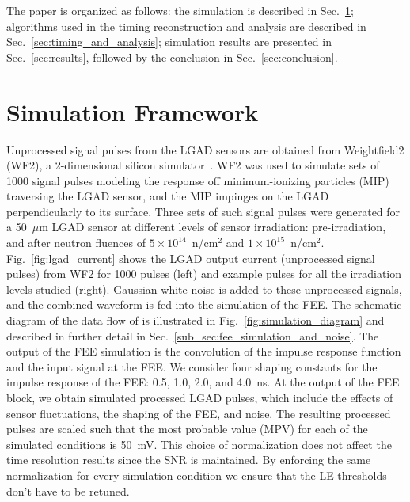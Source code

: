 \documentclass[preprint,1p]{elsarticle}
\begin{document}
The paper is organized as follows: the simulation is described in
Sec.~\ref{sec:simulation}; algorithms used in the timing
reconstruction and analysis are described in Sec.~\ref{sec:timing_and_analysis}; simulation results
are presented in Sec.~\ref{sec:results}, followed by the conclusion in
Sec.~\ref{sec:conclusion}.

\section{Simulation Framework}
\label{sec:simulation}

Unprocessed signal pulses from the LGAD sensors are obtained from Weightfield2
(WF2), a 2-dimensional silicon simulator~\cite{Sadrozinski:2017qpv}. WF2 was
used to simulate sets of 1000 signal pulses modeling the response off
minimum-ionizing particles (MIP) traversing the LGAD sensor, and the MIP
impinges on the LGAD perpendicularly to its surface. Three sets of such signal
pulses were generated for a 50~$\mu$m LGAD sensor at different levels of sensor
irradiation: pre-irradiation, and after neutron fluences of $5\times
10^{14}$~n/cm$^2$ and $1\times 10^{15}$~n/cm$^2$. Fig.~\ref{fig:lgad_current} shows the
LGAD output current (unprocessed signal pulses) from WF2 for 1000 pulses (left)
and example pulses for all the irradiation levels studied (right).
 Gaussian white noise is added
to these unprocessed signals, and the combined waveform is fed into the
simulation of the FEE. The schematic diagram of the data flow of is illustrated
in Fig.~\ref{fig:simulation_diagram} and described in further detail in
Sec.~\ref{sub_sec:fee_simulation_and_noise}. The output of the FEE simulation is
the convolution of the impulse response function and the input signal at the
FEE. We consider four shaping constants for the impulse response of the FEE:
0.5, 1.0, 2.0, and 4.0~\si{ns}. At the output of the FEE block, we obtain
simulated processed LGAD pulses, which include the effects of sensor
fluctuations, the shaping of the FEE, and noise. The resulting processed pulses
are scaled such that the most probable value (MPV) for each of the simulated conditions is 50~\si{mV}.
This choice of normalization does not affect the time resolution results since the SNR is
maintained. By enforcing the same normalization for every simulation condition
 we ensure that the LE thresholds don't have to be retuned.
\end{document}
